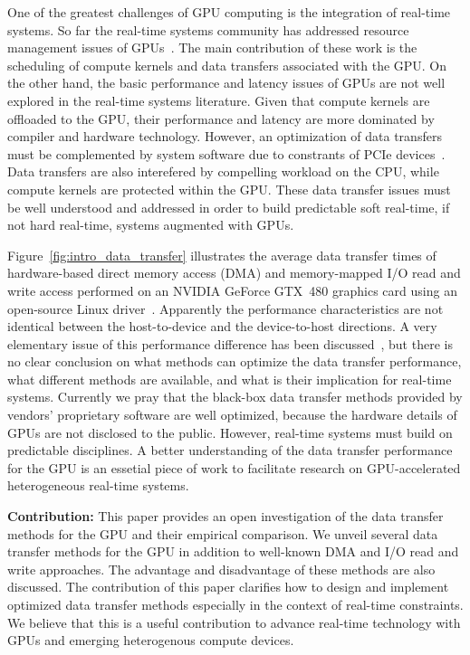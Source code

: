 One of the greatest challenges of GPU computing is the integration of
real-time systems.
So far the real-time systems community has addressed resource management
issues of GPUs~\cite{Basaran_ECRTS12, Elliott_RTS12, Elliott_ECRTS12,
Kato_ATC11, Kato_RTAS11, Kato_RTSS11}.
The main contribution of these work is the scheduling of compute
kernels and data transfers associated with the GPU.
On the other hand, the basic performance and latency issues of GPUs are
not well explored in the real-time systems literature.
Given that compute kernels are offloaded to the GPU, their performance
and latency are more dominated by compiler and hardware technology.
However, an optimization of data transfers must be complemented by system
software due to constrants of PCIe devices~\cite{Kato_ATC12}.
Data transfers are also interefered by compelling workload on the CPU,
while compute kernels are protected within the GPU.
These data transfer issues must be well understood and addressed in
order to build predictable soft real-time, if not hard real-time,
systems augmented with GPUs.

Figure~\ref{fig:intro_data_transfer} illustrates the average data
transfer times of hardware-based direct memory access (DMA) and
memory-mapped I/O read and write access performed on an NVIDIA GeForce
GTX~480 graphics card using an open-source Linux
driver~\cite{Kato_ATC12}.
Apparently the performance characteristics are not identical between the
host-to-device and the device-to-host directions.
A very elementary issue of this performance difference has been
discussed~\cite{Kato_ATC12}, but there is no clear conclusion on what
methods can optimize the data transfer performance, what different
methods are available, and what is their implication for real-time
systems.
Currently we pray that the black-box data transfer methods provided by
vendors' proprietary software are well optimized, because the hardware
details of GPUs are not disclosed to the public.
However, real-time systems must build on predictable disciplines.
A better understanding of the data transfer performance for the GPU is
an essetial piece of work to facilitate research on GPU-accelerated
heterogeneous real-time systems.

\textbf{Contribution:}
This paper provides an open investigation of the data transfer methods for
the GPU and their empirical comparison.
We unveil several data transfer methods for the GPU in addition to
well-known DMA and I/O read and write approaches.
The advantage and disadvantage of these methods are also discussed.
The contribution of this paper clarifies how to design and implement
optimized data transfer methods especially in the context of real-time
constraints.
We believe that this is a useful contribution to advance real-time
technology with GPUs and emerging heterogenous compute devices.

